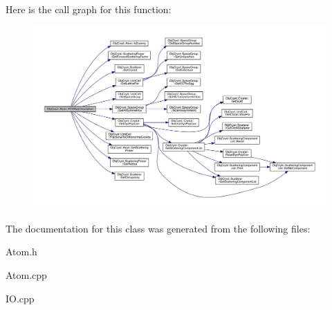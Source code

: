 Here is the call graph for this function\+:
\nopagebreak
\begin{figure}[H]
\begin{center}
\leavevmode
\includegraphics[width=350pt]{class_obj_cryst_1_1_atom_aaf6475195502fff91903f30b5c6c3345_cgraph}
\end{center}
\end{figure}


The documentation for this class was generated from the following files\+:\begin{DoxyCompactItemize}
\item 
Atom.\+h\item 
Atom.\+cpp\item 
I\+O.\+cpp\end{DoxyCompactItemize}
